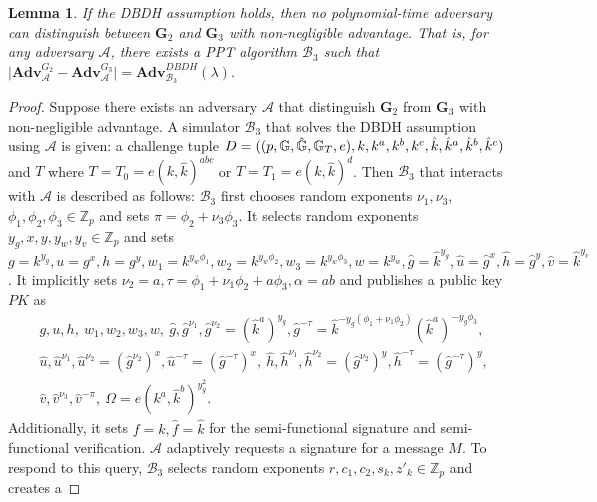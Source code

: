 \documentclass[11pt,letterpaper]{article}
\newtheorem{lemma}[theorem]{Lemma}
\newcommand{\G}{\mathbb{G}}
\newcommand{\Z}{\mathbb{Z}}
\newcommand{\Adv}{\textbf{Adv}}
\newcommand{\mc}[1]{\mathcal{#1}}
\newcommand{\tb}[1]{\textbf{#1}}
\newcommand{\lb}{\linebreak[0]}
\begin{document}
\begin{lemma} \label{lem:pks1-prime-3}
If the DBDH assumption holds, then no polynomial-time adversary can
distinguish between $\tb{G}_2$ and $\tb{G}_3$ with non-negligible advantage.
That is, for any adversary $\mc{A}$, there exists a PPT algorithm $\mc{B}_3$
such that
    $\big| \Adv_{\mc{A}}^{G_2} - \Adv_{\mc{A}}^{G_3} \big| =
    \Adv_{\mc{B}_3}^{DBDH}(\lambda)$.
\end{lemma}

\begin{proof}
Suppose there exists an adversary $\mc{A}$ that distinguish $\tb{G}_2$ from
$\tb{G}_3$ with non-negligible advantage. A simulator $\mc{B}_3$ that solves
the DBDH assumption using $\mc{A}$ is given: a challenge tuple
    $D = ((p, \G, \hat{\G}, \G_T, e), \lb
    k, k^a, k^b, k^c, \hat{k}, \hat{k}^a, \hat{k}^b, \hat{k}^c)$
    and $T$ where $T = T_0 = e(k, \hat{k})^{abc}$ or $T = T_1 = e(k, \hat{k})^d$.
Then $\mc{B}_3$ that interacts with $\mc{A}$ is described as follows:
$\mc{B}_3$ first chooses random exponents $\nu_1, \nu_3$, $\phi_1, \phi_2,
\phi_3 \in \Z_p$ and sets $\pi = \phi_2 + \nu_3 \phi_3$. It selects random
exponents $y_g, x, y, y_w, y_v \in \Z_p$ and sets
    $g = k^{y_g}, u = g^{x}, h = g^{y},
    w_1 = k^{y_w \phi_1}, w_2 = k^{y_w \phi_2}, w_3 = k^{y_w \phi_3}, w = k^{y_w},
    \hat{g} = \hat{k}^{y_g}, \hat{u} = \hat{g}^{x}, \hat{h} = \hat{g}^{y},
    \hat{v} = \hat{k}^{y_v}$.
It implicitly sets $\nu_2 = a, \tau = \phi_1 + \nu_1 \phi_2 + a \phi_3,
\alpha = ab$ and publishes a public key $PK$ as
    \begin{align*}
    &   g, u, h,~ w_1, w_2, w_3, w,~
        \hat{g}, \hat{g}^{\nu_1}, \hat{g}^{\nu_2} = (\hat{k}^a)^{y_g},
        \hat{g}^{-\tau} = \hat{k}^{-y_g (\phi_1 + \nu_1 \phi_2)}
            (\hat{k}^a)^{-y_g \phi_3},~ \\
    &   \hat{u}, \hat{u}^{\nu_1}, \hat{u}^{\nu_2} = (\hat{g}^{\nu_2})^x,
        \hat{u}^{-\tau} = (\hat{g}^{-\tau})^x,~
        \hat{h}, \hat{h}^{\nu_1}, \hat{h}^{\nu_2} = (\hat{g}^{\nu_2})^y,
        \hat{h}^{-\tau} = (\hat{g}^{-\tau})^y,~ \\
    &   \hat{v}, \hat{v}^{\nu_3}, \hat{v}^{-\pi},~
        \Omega = e(k^a, \hat{k}^b)^{y_g^2}.
    \end{align*}
Additionally, it sets $f = k, \hat{f} = \hat{k}$ for the semi-functional
signature and semi-functional verification. $\mc{A}$ adaptively requests a
signature for a message $M$. To respond to this query, $\mc{B}_3$ selects
random exponents $r, c_1, c_2, s_k, z'_k \in \Z_p$ and creates a

\end{proof}
\end{document}
